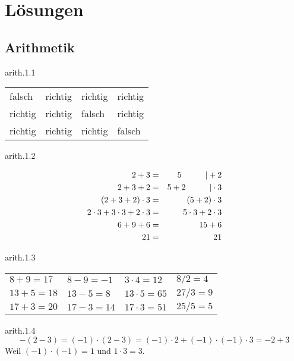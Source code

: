 
\chapter{Lösungen}


\section{Arithmetik}
\begin{sol}{arith.1.1}
\begin{center}
\begin{tabular}{C{2cm}C{2cm}C{2cm}C{2cm}}
falsch & richtig & richtig & richtig \\
richtig & richtig & falsch & richtig \\
richtig & richtig & richtig & falsch
\end{tabular}
\end{center}
\end{sol}


\begin{sol}{arith.1.2}

\begin{eqnarray*}
2+3 &=& 5 \hskip 1cm | +2 \\
2+3+2 &=& 5+2 \hskip 1cm | \cdot 3 \\
(2+3+2) \cdot 3 &=& (5+2)\cdot 3 \\
2\cdot 3 + 3\cdot 3 + 2\cdot 3 &=& 5\cdot 3 +2 \cdot 3 \\
6+9+6 &=& 15 + 6 \\
21 &=& 21
\end{eqnarray*}

\end{sol}

\begin{sol}{arith.1.3}
\begin{center}
\begin{tabular}{C{2cm}C{2cm}C{2cm}C{2cm}}
$8+9=17$ & $8-9 =-1$ & $3\cdot 4=12$ & $8/2=4$ \\
$13+5=18$ & $13-5=8$ & $13\cdot 5=65$ & $27/3=9$ \\
$17+3=20$ & $17-3=14$ & $17\cdot 3=51$ & $25/5=5$
\end{tabular}
\end{center}
\end{sol}

\begin{sol}{arith.1.4}
\[-(2-3) = (-1)\cdot (2-3) = (-1)\cdot 2 + (-1)\cdot (-1) \cdot 3 = -2+3\]
Weil $(-1)\cdot (-1)=1$ und $1\cdot 3 = 3$.
\end{sol}